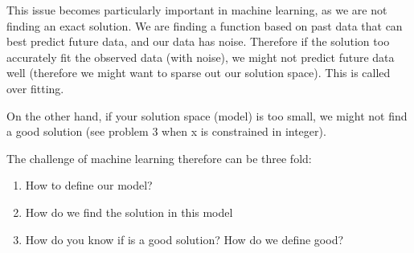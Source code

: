 This issue becomes particularly important in machine learning, as we are not finding an exact solution. We are finding a function based on past data that can best predict future data, and our data has noise. Therefore if the solution too accurately fit the observed data (with noise), we might not predict future data well (therefore we might want to sparse out our solution space). This is called over fitting.

On the other hand, if your solution space (model) is too small, we might not find a good solution (see problem 3 when x is constrained in integer).

The challenge of machine learning therefore can be three fold:

\begin{enumerate}
\item How to define our model?
\item How do we find the solution in this model
\item How do you know if is a good solution? How do we define good?
\end{enumerate}

\pagebreak